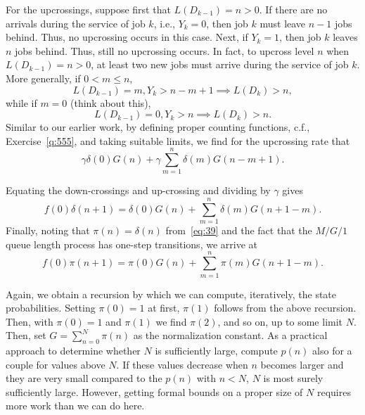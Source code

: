 For the upcrossings, suppose first that $L(D_{k-1})=n>0$. If there are
no arrivals during the service of job $k$, i.e., $Y_k=0$, then job $k$
must leave $n-1$ jobs behind. Thus, no upcrossing occurs in this
case. Next, if $Y_k=1$, then job $k$ leaves $n$ jobs behind. Thus,
still no upcrossing occurs. In fact, to upcross level $n$ when
$L(D_{k-1})=n>0$, at least two new jobs must arrive during the service
of job $k$. More generally, if $0<m\leq n$,
\begin{equation*}
  L(D_{k-1})=m, Y_k > n-m+1 \implies L(D_k) > n,
\end{equation*}
while if $m=0$ (think about this),
\begin{equation*}
  L(D_{k-1})=0, Y_k > n \implies L(D_k) > n.
\end{equation*}
Similar to our earlier work, by defining proper counting functions,
c.f., Exercise~\ref{q:555}, and taking suitable limits, we find for
the upcrossing rate that
\begin{equation}\label{eq:555}
\gamma \delta(0) G(n) + \gamma \sum_{m=1}^n \delta(m) G(n-m+1).
\end{equation}

Equating the down-crossings and up-crossing and dividing by $\gamma$
gives
\begin{equation}\label{eq:72}
  f(0) \delta(n+1) = \delta(0) G(n) + \sum_{m=1}^{n} \delta(m) G(n+1-m).
\end{equation}
Finally, noting that $\pi(n) = \delta(n)$ from~\eqref{eq:39} and the
fact that the $M/G/1$ queue length process has one-step transitions,
we arrive at
\begin{equation*}
  f(0) \pi(n+1) = \pi(0) G(n) + \sum_{m=1}^{n} \pi(m) G(n+1-m).
\end{equation*}

Again, we obtain a recursion by which we can compute, iteratively, the
state probabilities.  Setting $\pi(0)=1$ at first, $\pi(1)$ follows
from the above recursion. Then, with $\pi(0)=1$ and $\pi(1)$ we find
$\pi(2)$, and so on, up to some limit $N$. Then, set
$G=\sum_{n=0}^N \pi(n)$ as the normalization constant. As a practical
approach to determine whether $N$ is sufficiently large, compute
$p(n)$ also for a couple for values above $N$. If these values
decrease when $n$ becomes larger and they are very small compared to
the $p(n)$ with $n<N$, $N$ is most surely sufficiently large. However,
getting formal bounds on a proper size of $N$ requires more work than
we can do here.

